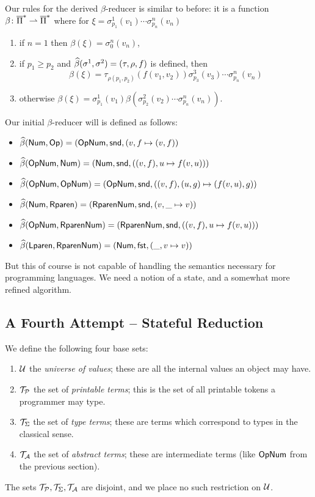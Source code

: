 \documentclass{llncs}
\newcounter{algo}
\begin{document}
Our rules for the derived $\beta$-reducer is similar to before: it is a function $\beta\colon\overline\Pi^* \rightharpoonup \overline\Pi^*$ where for $\xi=\sigma^1_{p_1}(v_1)\cdots\sigma^n_{p_n}(v_n)$
\begin{enumerate}
    \item if $n=1$ then $\beta(\xi)=\sigma^n_0(v_n)$,
    \item if $p_1\geq p_2$ and $\widehat\beta(\sigma^1,\sigma^2)=(\tau,\rho,f)$ is defined, then
    \[ \beta(\xi)=\tau_{\rho(p_1,p_2)}(f(v_1,v_2))\sigma^3_{p_3}(v_3)\cdots\sigma^n_{p_n}(v_n) \]
    \item otherwise $\beta(\xi)=\sigma^1_{p_1}(v_1)\beta(\sigma^2_{p_2}(v_2)\cdots\sigma^n_{p_n}(v_n))$.
\end{enumerate}

Our initial $\beta$-reducer will is defined as follows:
\begin{itemize}
    \item $\widehat\beta(\mathsf{Num},\mathsf{Op})=(\mathsf{Op}\mathsf{Num},\mathsf{snd},(v,f\mapsto(v,f))$
    \item $\widehat\beta(\mathsf{Op}\mathsf{Num},\mathsf{Num})=(\mathsf{Num},\mathsf{snd},((v,f),u\mapsto f(v,u)))$
    \item $\widehat\beta(\mathsf{Op}\mathsf{Num},\mathsf{Op}\mathsf{Num})=(\mathsf{Op}\mathsf{Num},\mathsf{snd},((v,f),(u,g)\mapsto (f(v,u),g))$
    \item $\widehat\beta(\mathsf{Num},\mathsf{Rparen})=(\mathsf{Rparen}\mathsf{Num},\mathsf{snd},(v,\_\mapsto v))$
    \item $\widehat\beta(\mathsf{Op}\mathsf{Num},\mathsf{Rparen}\mathsf{Num})=(\mathsf{Rparen}\mathsf{Num},\mathsf{snd},((v,f),u\mapsto f(v,u)))$
    \item $\widehat\beta(\mathsf{Lparen},\mathsf{Rparen}\mathsf{Num})=(\mathsf{Num},\mathsf{fst},(\_,v\mapsto v))$
\end{itemize}

But this of course is not capable of handling the semantics necessary for programming languages.
We need a notion of a state, and a somewhat more refined algorithm.

\subsection{A Fourth Attempt -- Stateful Reduction}

We define the following four base sets:
\begin{enumerate}
    \item $\mathcal U$ the \textit{universe of values}; these are all the internal values an object may have.
    \item $\mathcal T_{\mathcal P}$ the set of \textit{printable terms}; this is the set of all printable tokens a programmer may type.
    \item $\mathcal T_{\Sigma}$ the set of \textit{type terms}; these are terms which correspond to types in the classical sense.
    \item $\mathcal T_{\mathcal A}$ the set of \textit{abstract terms}; these are intermediate terms (like $\mathsf{Op}\mathsf{Num}$ from the previous section).
\end{enumerate}
The sets $\mathcal T_{\mathcal P},\mathcal T_{\Sigma},\mathcal T_{\mathcal A}$ are disjoint, and we place no such restriction on $\mathcal U$.
\end{document}
